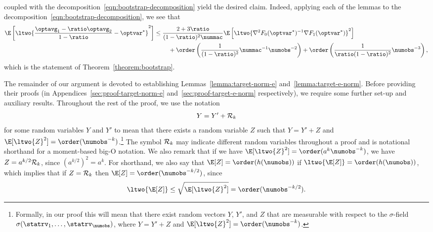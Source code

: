 \documentclass[11pt,twoside]{article}
\theoremstyle{definition}
\begin{document}
coupled with the decomposition~\eqref{eqn:bootstrap-decomposition}
yield the desired claim. Indeed, applying each
of the lemmas to the decomposition~\eqref{eqn:bootstrap-decomposition}, we see
that
\begin{align*}
  \E\left[\ltwo{\frac{\optavg_1 - \ratio\optavg_2}{1 - \ratio}
      -\optvar^*}^2\right]
  & \le \frac{2+3 \ratio}{(1 - \ratio)^2 \nummac}
  \E\left[\ltwo{\nabla^2 F_0(\optvar^*)^{-1}\nabla F_1(\optvar^*)}^2\right] \\
  &\qquad ~ +
  \order\left(\frac{1}{(1 - \ratio)^2}\nummac^{-1}\numobs^{-2}\right)
  + \order\left(\frac{1}{\ratio (1 - \ratio)^2} \numobs^{-3}\right),
\end{align*}
which is the statement of Theorem~\ref{theorem:bootstrap}.

The remainder of our argument is devoted to establishing
Lemmas~\ref{lemma:target-norm-e} and~\ref{lemma:target-e-norm}.
Before providing their proofs (in
Appendices~\ref{sec:proof-target-norm-e}
and~\ref{sec:proof-target-e-norm} respectively), we require some
further set-up and auxiliary results.  Throughout the rest of the
proof, we use the notation
\begin{equation*}
  Y = Y' + \mathcal{R}_k
\end{equation*}
for some random variables $Y$ and $Y'$ to mean that there exists a random
variable $Z$ such that $Y = Y' + Z$ and $\E[\ltwo{Z}^2] =
\order(\numobs^{-k})$.\footnote{ Formally, in our proof this will mean that
  there exist random vectors $Y$, $Y'$, and $Z$ that are measurable with
  respect to the $\sigma$-field $\sigma(\statrv_1, \ldots, \statrv_\numobs)$,
  where $Y = Y' + Z$ and $\E[\ltwo{Z}^2] = \order(\numobs^{-k})$.}
The symbol $\mathcal{R}_k$ may
indicate different random variables throughout a proof and is notational
shorthand for a moment-based big-O notation. We also remark that
if we have $\E[\ltwo{Z}^2] = \order(a^k \numobs^{-k})$, we
have $Z = a^{k/2} \mathcal{R}_k$, since $(a^{k/2})^2 = a^k$.
For shorthand, we also say
that $\E[Z] = \order(h(\numobs))$ if $\ltwo{\E[Z]} =
\order(h(\numobs))$, which implies that if $Z = \mathcal{R}_k$ then
$\E[Z] = \order(\numobs^{-k/2})$, since
\begin{equation*}
  \ltwo{\E[Z]} \le \sqrt{\E[\ltwo{Z}^2]} = \order(\numobs^{-k/2}).
\end{equation*}
\end{document}
